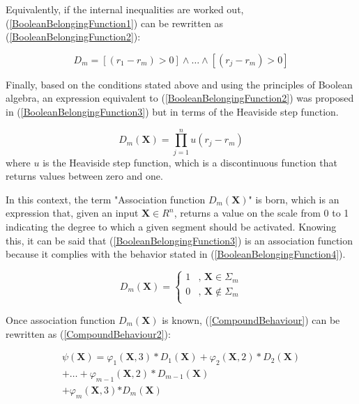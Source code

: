 \documentclass{ieeeaccess}
\begin{document}
Equivalently, if the internal inequalities are worked out, (\ref{BooleanBelongingFunction1}) can be rewritten as (\ref{BooleanBelongingFunction2}):

\begin{equation}\label{BooleanBelongingFunction2}
 D_m=\left[\left(r_1-r_m\right)>0\right]\land\ldots\land\left[\left(r_j-r_m\right)>0\right]
\end{equation}

Finally, based on the conditions stated above and using the principles of Boolean algebra, an expression equivalent to (\ref{BooleanBelongingFunction2}) was proposed in (\ref{BooleanBelongingFunction3}) but in terms of the Heaviside step function.

\begin{equation}\label{BooleanBelongingFunction3}
 D_m\left(\mathbf{X}\right)=\prod_{j=1}^{n}u(r_j-r_m)
\end{equation}
where \(u\) is the Heaviside step function, which is a discontinuous function that returns values between zero and one.

In this context, the term "Association function \(D_m\left(\mathbf{X}\right)\)" is born, which is an expression that, given an input \(\mathbf{X}\in R^n \), returns a value on the scale from 0 to 1 indicating the degree to which a given segment should be activated. Knowing this, it can be said that (\ref{BooleanBelongingFunction3}) is an association function because it complies with the behavior stated in (\ref{BooleanBelongingFunction4}).

\begin{equation}\label{BooleanBelongingFunction4}
 D_m\left(\mathbf{X}\right)=
 \begin{cases}
 1 &,\, \mathbf{X}\in\Sigma_m\\
 0 &,\, \mathbf{X}\notin\Sigma_m\\
 \end{cases}
\end{equation}

Once association function \(D_m\left(\mathbf{X}\right)\) is known, (\ref{CompoundBehaviour}) can be rewritten as (\ref{CompoundBehaviour2}):

\begin{equation}\label{CompoundBehaviour2}
\begin{matrix}
\psi\left(\mathbf{X}\right)=\varphi_1\left(\mathbf{X},3\right)\ast D_1\left(\mathbf{X}\right)+\varphi_2\left(\mathbf{X},2\right)\ast D_2\left(\mathbf{X}\right)\\
+\ldots+\varphi_{m-1}\left(\mathbf{X},2\right)\ast D_{m-1}\left(\mathbf{X}\right)\\
+\varphi_m\left(\mathbf{X},3\right){\ast D}_m\left(\mathbf{X}\right)
\end{matrix}
\end{equation}
\end{document}
